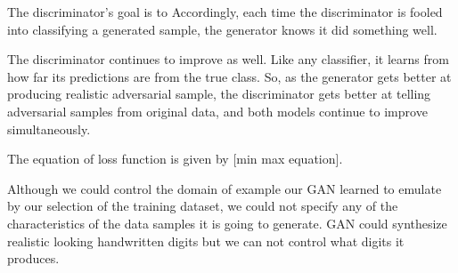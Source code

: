  
 

The discriminator's goal is to 
 Accordingly, each time the discriminator is fooled into classifying a generated sample, the generator knows it did something well.
 
The discriminator continues to improve as well. Like any classifier, it learns from how far its predictions are from the true class. 
So, as the generator gets better at producing realistic adversarial sample, the discriminator gets better at telling adversarial samples from original data, and both models continue to improve simultaneously. 


The equation
of loss function is given by [min max equation]. 






Although we could control the domain of example our GAN learned to emulate by our selection of the training dataset, we could not specify any of the characteristics of the data samples it is going to generate. GAN could synthesize realistic looking handwritten digits but we can not control what digits it produces.




